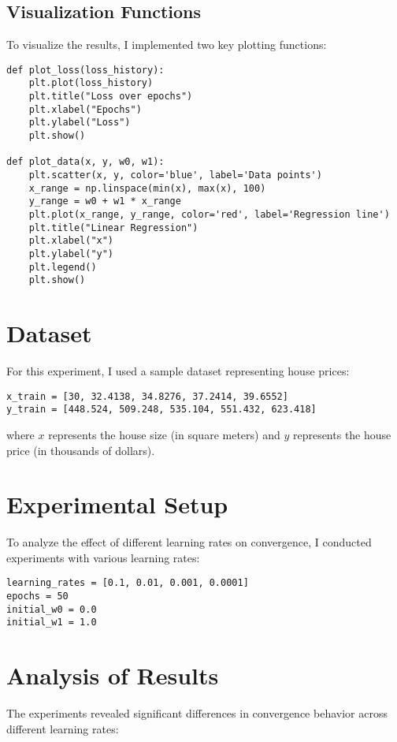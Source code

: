 \documentclass[hidelinks]{report}
\begin{document}
\subsection{Visualization Functions}
\noindent To visualize the results, I implemented two key plotting functions:

\begin{verbatim}
def plot_loss(loss_history):
    plt.plot(loss_history)
    plt.title("Loss over epochs")
    plt.xlabel("Epochs")
    plt.ylabel("Loss")
    plt.show()
    
def plot_data(x, y, w0, w1):    
    plt.scatter(x, y, color='blue', label='Data points')
    x_range = np.linspace(min(x), max(x), 100)
    y_range = w0 + w1 * x_range
    plt.plot(x_range, y_range, color='red', label='Regression line')
    plt.title("Linear Regression")
    plt.xlabel("x")
    plt.ylabel("y")
    plt.legend()
    plt.show()
\end{verbatim}

\section{Dataset}
\noindent For this experiment, I used a sample dataset representing house prices:

\begin{verbatim}
x_train = [30, 32.4138, 34.8276, 37.2414, 39.6552]
y_train = [448.524, 509.248, 535.104, 551.432, 623.418]
\end{verbatim}

\noindent where $x$ represents the house size (in square meters) and $y$ represents the house price (in thousands of dollars).

\section{Experimental Setup}
\noindent To analyze the effect of different learning rates on convergence, I conducted experiments with various learning rates:

\begin{verbatim}
learning_rates = [0.1, 0.01, 0.001, 0.0001]
epochs = 50
initial_w0 = 0.0
initial_w1 = 1.0
\end{verbatim}

\section{Analysis of Results}
\noindent The experiments revealed significant differences in convergence behavior across different learning rates:
\end{document}
